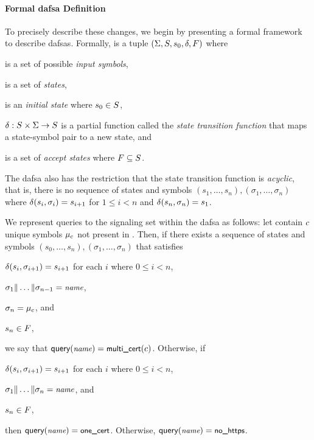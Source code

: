 \paragraph{Formal \ac{dafsa} Definition}

To precisely describe these changes, we begin by presenting a formal framework
to describe \acp{dafsa}. Formally,  is a tuple $(\Sigma, S,
s_0, \delta, F)$ where
\begin{inparaenum}
\item \symbols is a set of possible \emph{input symbols},
\item \states is a set of \emph{states},
\item \initstate is an \emph{initial state} where $s_0 \in S$,
\item $\delta: S \times \Sigma \to S$ is a partial function
  called the \emph{state transition function} that maps a state-symbol pair to a
  new state, and
\item \finalstates is a set of \emph{accept states} where $F
  \subseteq S$.
\end{inparaenum}
The \ac{dafsa} also has the restriction that the state transition function is
\emph{acyclic}, that is, there is no sequence of states and symbols $(s_1,
\ldots, s_n), (\sigma_1, \ldots, \sigma_n)$ where $\delta(s_i, \sigma_i) =
s_{i+1}$ for $1 \le i < n$ and $\delta(s_n, \sigma_n) = s_1$.

We represent queries to the signaling set within the \ac{dafsa} as follows: let
\states contain $c$ unique symbols $\mu_c$ not present in \httpsset. 
Then, if there exists a sequence of
states and symbols $(s_0, \ldots, s_n), (\sigma_1, \ldots, \sigma_n)$ that
satisfies
\begin{inparaenum}
\item $\delta(s_i, \sigma_{i+1}) = s_{i+1}$ for each $i$ where $0 \le i < n$,
\item $\sigma_1 \| \dots \| \sigma_{n-1} = \small{\emph{name}}$, 
\item $\sigma_n = \mu_c$, and
\item $s_n \in F$,
\end{inparaenum}
we say that $\textsf{query}(\small{\emph{name}}) = \textsf{multi\_cert}(c)$.
Otherwise, if
\begin{inparaenum}
\item $\delta(s_i, \sigma_{i+1}) = s_{i+1}$ for each $i$ where $0 \le i < n$,
\item $\sigma_1 \| \dots \| \sigma_{n} = \small{\emph{name}}$, and
\item $s_n \in F$,
\end{inparaenum}
then $\textsf{query}(\small{\emph{name}}) = \textsf{one\_cert}$. Otherwise, $\textsf{query}(\small{\emph{name}}) = \textsf{no\_https}$.

